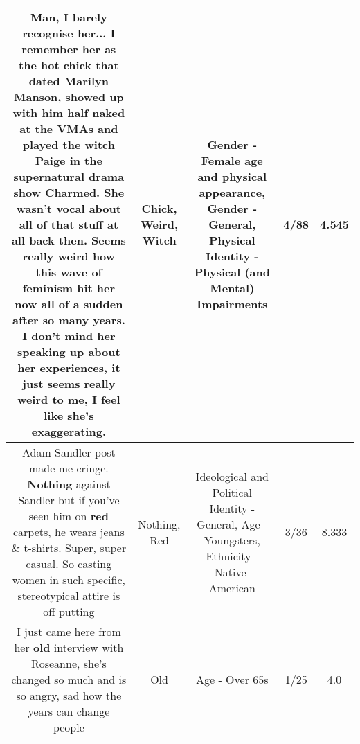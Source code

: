 \documentclass[11pt]{article}
\newlength\mylength
\begin{document}
\begin{center}
\begin{longtable}{|C{.65\mylength}|C{.30\mylength}|C{.12\mylength}|C{.12\mylength}|C{.12\mylength}|}
  \small Man, I barely recognise her... I remember her as the hot \textbf{chick} that dated Marilyn Manson, showed up with him half naked at the VMAs and played the \textbf{witch} Paige in the supernatural drama show Charmed. She wasn't vocal about all of that stuff at all back then. Seems really \textbf{weird} how this wave of feminism hit her now all of a sudden after so many years. I don't mind her speaking up about her experiences, it just seems really \textbf{weird} to me, I feel like she's exaggerating.\normalsize   & Chick, Weird, Witch & Gender - Female age and physical appearance, Gender - General, Physical Identity - Physical (and Mental) Impairments & 4/88 & 4.545 \\  \hline
  \small Adam Sandler post made me cringe. \textbf{Nothing} against Sandler but if you've seen him on \textbf{r\textbf{ed}} carpets, he wears jeans \& t-shirts. Super, super casual. So casting women in such specific, stereotypical attire is off putting\normalsize   & Nothing, Red &  Ideological and Political Identity - General, Age - Youngsters, Ethnicity - Native-American & 3/36 & 8.333 \\  \hline
  \small I just came here from her \textbf{old} interview with Roseanne, she's changed so much and is so angry, sad how the years can change people\normalsize   & Old & Age - Over 65s & 1/25 & 4.0 \\  \hline

\end{longtable}
\end{center}
\end{document}
